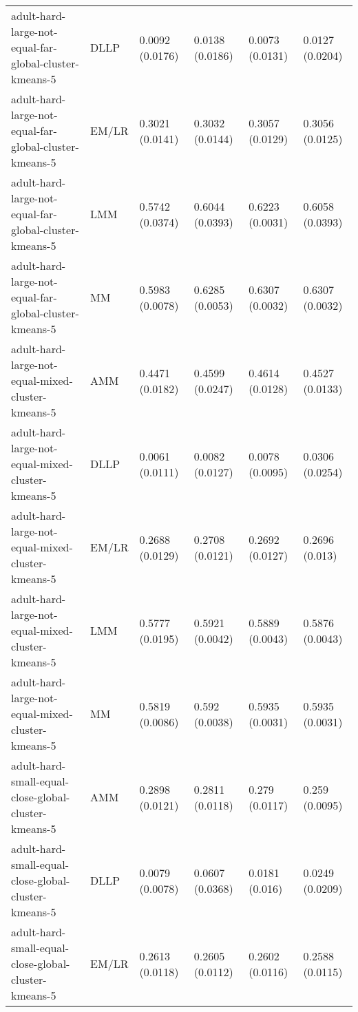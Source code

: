 \begin{longtable}{llllll}
                                 adult-hard-large-not-equal-far-global-cluster-kmeans-5 &      DLLP & 0.0092 (0.0176) &  0.0138 (0.0186) &   0.0073 (0.0131) &     0.0127 (0.0204) \\
                                 adult-hard-large-not-equal-far-global-cluster-kmeans-5 &     EM/LR & 0.3021 (0.0141) &  0.3032 (0.0144) &   0.3057 (0.0129) &     0.3056 (0.0125) \\
                                 adult-hard-large-not-equal-far-global-cluster-kmeans-5 &       LMM & 0.5742 (0.0374) &  0.6044 (0.0393) &   0.6223 (0.0031) &     0.6058 (0.0393) \\
                                 adult-hard-large-not-equal-far-global-cluster-kmeans-5 &        MM & 0.5983 (0.0078) &  0.6285 (0.0053) &   0.6307 (0.0032) &     0.6307 (0.0032) \\
                                      adult-hard-large-not-equal-mixed-cluster-kmeans-5 &       AMM & 0.4471 (0.0182) &  0.4599 (0.0247) &   0.4614 (0.0128) &     0.4527 (0.0133) \\
                                      adult-hard-large-not-equal-mixed-cluster-kmeans-5 &      DLLP & 0.0061 (0.0111) &  0.0082 (0.0127) &   0.0078 (0.0095) &     0.0306 (0.0254) \\
                                      adult-hard-large-not-equal-mixed-cluster-kmeans-5 &     EM/LR & 0.2688 (0.0129) &  0.2708 (0.0121) &   0.2692 (0.0127) &      0.2696 (0.013) \\
                                      adult-hard-large-not-equal-mixed-cluster-kmeans-5 &       LMM & 0.5777 (0.0195) &  0.5921 (0.0042) &   0.5889 (0.0043) &     0.5876 (0.0043) \\
                                      adult-hard-large-not-equal-mixed-cluster-kmeans-5 &        MM & 0.5819 (0.0086) &   0.592 (0.0038) &   0.5935 (0.0031) &     0.5935 (0.0031) \\
                                   adult-hard-small-equal-close-global-cluster-kmeans-5 &       AMM & 0.2898 (0.0121) &  0.2811 (0.0118) &    0.279 (0.0117) &      0.259 (0.0095) \\
                                   adult-hard-small-equal-close-global-cluster-kmeans-5 &      DLLP & 0.0079 (0.0078) &  0.0607 (0.0368) &    0.0181 (0.016) &     0.0249 (0.0209) \\
                                   adult-hard-small-equal-close-global-cluster-kmeans-5 &     EM/LR & 0.2613 (0.0118) &  0.2605 (0.0112) &   0.2602 (0.0116) &     0.2588 (0.0115) \\

\end{longtable}
